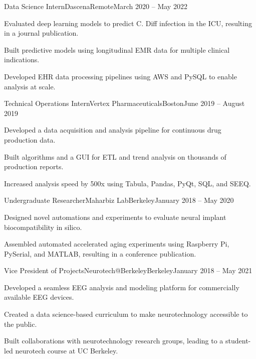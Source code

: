 \begin{joblong}{Data Science Intern}{Dascena}{Remote}{March 2020 -- May 2022}
    \item Evaluated deep learning models to predict C. Diff infection in the ICU, resulting in a journal publication.
    \item Built predictive models using longitudinal EMR data for multiple clinical indications.
    \item Developed EHR data processing pipelines using AWS and PySQL to enable analysis at scale.
\end{joblong}

\begin{joblong}{Technical Operations Intern}{Vertex Pharmaceuticals}{Boston}{June 2019 -- August 2019}
    \item Developed a data acquisition and analysis pipeline for continuous drug production data.
    \item Built algorithms and a GUI for ETL and trend analysis on thousands of production reports.
    \item Increased analysis speed by 500x using Tabula, Pandas, PyQt, SQL, and SEEQ.
\end{joblong}

\begin{joblong}{Undergraduate Researcher}{Maharbiz Lab}{Berkeley}{January 2018 -- May 2020}
    \item Designed novel automations and experiments to evaluate neural implant biocompatibility in silico.
    \item Assembled automated accelerated aging experiments using Raspberry Pi, PySerial, and MATLAB, resulting in a conference publication.
\end{joblong}

\begin{joblong}{Vice President of Projects}{Neurotech@Berkeley}{Berkeley}{January 2018 -- May 2021}
    \item Developed a seamless EEG analysis and modeling platform for commercially available EEG devices.
    \item Created a data science-based curriculum to make neurotechnology accessible to the public.
    \item Built collaborations with neurotechnology research groups, leading to a student-led neurotech course at UC Berkeley.
\end{joblong}
